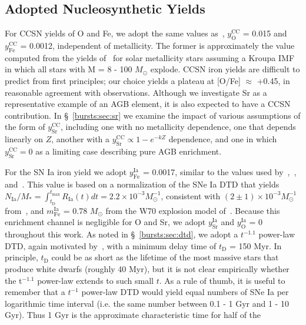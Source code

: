 \subsection{Adopted Nucleosynthetic Yields} 
\label{bursts:sec:yields} 
For CCSN yields of O and Fe, we adopt the same values 
as~\citet{Weinberg2017b}, $y_\text{O}^\text{CC}$ = 0.015 and 
$y_\text{Fe}^\text{CC}$ = 0.0012, independent of metallicity. The former is 
approximately the value computed from the yields of~\citet{Chieffi2004} 
for solar metallicity stars assuming a Kroupa IMF in which all stars with M = 
8 - 100 $M_\odot$ explode. CCSN iron yields are difficult to predict from 
first principles; our choice yields a plateau at [O/Fe] $\approx$ +0.45, in 
reasonable agreement with observations. Although we investigate Sr as a 
representative example of an AGB element, it is also expected to have a CCSN 
contribution. In \S~\ref{bursts:sec:sr} we examine the impact of various assumptions 
of the form of $y_\text{Sr}^\text{CC}$, including one with no 
metallicity dependence, one that depends linearly on $Z$, another with a 
$y_\text{Sr}^\text{CC} \propto 1 - e^{-kZ}$ dependence, and one in which 
$y_\text{Sr}^\text{CC} = 0$ as a limiting case describing pure AGB enrichment. 
\par
For the SN Ia iron yield we adopt $y_\text{Fe}^\text{Ia}$ = 0.0017, similar to 
the values used by~\citet{Schoenrich2009a},~\citet{Andrews2017}, 
and~\citet{Weinberg2017b}. This value is based on a normalization of the 
SNe Ia DTD that yields $N_\text{Ia}/M_* = \int_{t_\text{D}}^{t_\text{max}}
R_\text{Ia}(t)dt = 2.2\times10^{-3} M_\odot^{-1}$, consistent with 
$(2\pm1)\times10^{-3} M_\odot^{-1}$ from~\citet{Maoz2012a}, and 
$m_\text{Fe}^\text{Ia}$ = 0.78 $M_\odot$ from the W70 explosion model 
of~\citet{Iwamoto1999}. Because this enrichment channel is negligible for 
O and Sr, we adopt $y_\text{Sr}^\text{Ia}$ and $y_\text{O}^\text{Ia}$ = 0 
throughout this work. As noted in \S~\ref{bursts:sec:dtd}, we adopt a 
$t^{-1.1}$ power-law DTD, again motivated by~\citet{Maoz2012a}, with a minimum 
delay time of $t_\text{D}$ = 150 Myr. In principle, $t_\text{D}$ could be as 
short as the lifetime of the most massive stars that produce white dwarfs 
(roughly 40 Myr), but it is not clear empirically whether the t$^{-1.1}$ 
power-law extends to such small $t$. As a rule of thumb, it is useful to 
remember that a $t^{-1}$ power-law DTD would yield equal numbers of SNe Ia 
per logarithmic time interval (i.e. the same number between 0.1 - 1 Gyr and 
1 - 10 Gyr). Thus 1 Gyr is the approximate characteristic time for half of the 
